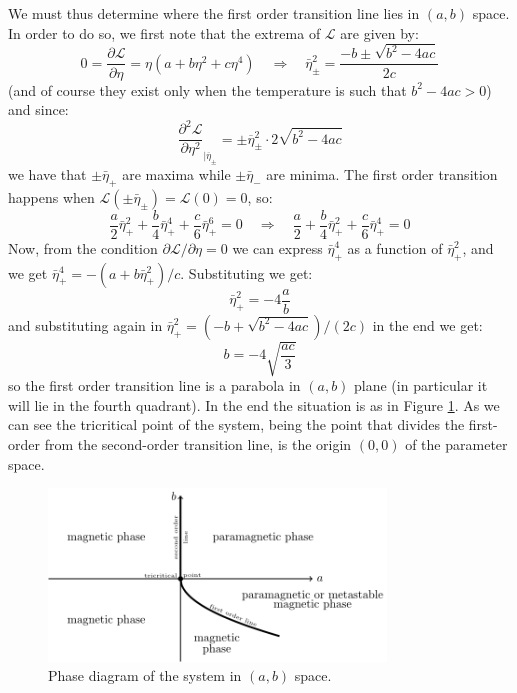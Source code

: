 \documentclass[../main/main.tex]{subfiles}
\begin{document}
 We must thus determine where the first order transition line lies in \( (a,b) \) space. In order to do so, we first note that the extrema of \( \mathcal{L} \)  are given by:
\begin{equation*}
 0={\frac {\partial {\mathcal {L}}}{\partial \eta }}=\eta (a+b\eta ^{2}+c\eta ^{4})\quad \Rightarrow \quad {\bar {\eta }}_{\pm }^{2}={\frac {-b\pm {\sqrt {b^{2}-4ac}}}{2c}}
\end{equation*}
(and of course they exist only when the temperature is such that \( b^{2}-4ac>0 \)) and since:
\begin{equation*}
  \displaystyle {\frac {\partial ^{2}{\mathcal {L}}}{\partial \eta ^{2}}}_{|{\overline {\eta }}_{\pm }}=\pm {\overline {\eta }}_{\pm }^{2}\cdot 2{\sqrt {b^{2}-4ac}}
\end{equation*}
we have that \( \pm \bar{\eta }_+  \) are maxima while \( \pm \bar{\eta }_-  \) are minima. The first order transition happens when \( \mathcal{L} (\pm \bar{\eta }_\pm  )  = \mathcal{L} (0) = 0 \), so:
\begin{equation*}
{\frac {a}{2}}{\bar {\eta }}_{+}^{2}+{\frac {b}{4}}{\bar {\eta }}_{+}^{4}+{\frac {c}{6}}{\bar {\eta }}_{+}^{6}=0\quad \Rightarrow \quad {\frac {a}{2}}+{\frac {b}{4}}{\bar {\eta }}_{+}^{2}+{\frac {c}{6}}{\bar {\eta }}_{+}^{4}=0
\end{equation*}
Now, from the condition  \(\partial {\mathcal {L}}/\partial \eta =0  \) we can express \( \bar{\eta }_{+}^{4}  \) as a function of \( \bar{\eta }_{+}^{2}  \), and we get \( \bar {\eta }_{+}^{4} =- (a+b \bar {\eta }_{+}^{2})/c \).
 Substituting we get:
\begin{equation*}
   \bar {\eta }_{+}^{2}=-4\frac {a}{b}
\end{equation*}
and substituting again in \( \bar {\eta }_{+}^{2} =(-b+\sqrt {b^2-4ac} )/(2c) \)  in the end we get:
\begin{equation*}
  b=-4 \sqrt { \frac {ac}{3} }
\end{equation*}
so the first order transition line is a parabola in \( (a,b) \)  plane (in particular it will lie in the fourth quadrant). In the end the situation is as in Figure \ref{fig:16_8}. As we can see the tricritical point of the system, being the point that divides the first-order from the second-order transition line, is the origin \( (0,0) \) of the parameter space.

\begin{figure}[h!]
\centering
\includegraphics[width=0.8\textwidth]{../lessons/16_image/8.png}
\caption{\label{fig:16_8} Phase diagram of the system in  \( (a,b) \) space.}
\end{figure}
\end{document}
